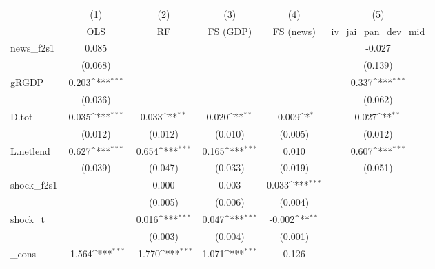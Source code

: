 {
\def\sym#1{\ifmmode^{#1}\else\(^{#1}\)\fi}
\begin{tabular}{l*{5}{c}}
\toprule
            &\multicolumn{1}{c}{(1)}&\multicolumn{1}{c}{(2)}&\multicolumn{1}{c}{(3)}&\multicolumn{1}{c}{(4)}&\multicolumn{1}{c}{(5)}\\
            &\multicolumn{1}{c}{OLS}&\multicolumn{1}{c}{RF}&\multicolumn{1}{c}{FS (GDP)}&\multicolumn{1}{c}{FS (news)}&\multicolumn{1}{c}{iv\_jai\_pan\_dev\_mid}\\
\midrule
news\_f2s1   &       0.085         &                     &                     &                     &      -0.027         \\
            &     (0.068)         &                     &                     &                     &     (0.139)         \\
\addlinespace
gRGDP       &       0.203\sym{***}&                     &                     &                     &       0.337\sym{***}\\
            &     (0.036)         &                     &                     &                     &     (0.062)         \\
\addlinespace
D.tot       &       0.035\sym{***}&       0.033\sym{**} &       0.020\sym{**} &      -0.009\sym{*}  &       0.027\sym{**} \\
            &     (0.012)         &     (0.012)         &     (0.010)         &     (0.005)         &     (0.012)         \\
\addlinespace
L.netlend   &       0.627\sym{***}&       0.654\sym{***}&       0.165\sym{***}&       0.010         &       0.607\sym{***}\\
            &     (0.039)         &     (0.047)         &     (0.033)         &     (0.019)         &     (0.051)         \\
\addlinespace
shock\_f2s1  &                     &       0.000         &       0.003         &       0.033\sym{***}&                     \\
            &                     &     (0.005)         &     (0.006)         &     (0.004)         &                     \\
\addlinespace
shock\_t     &                     &       0.016\sym{***}&       0.047\sym{***}&      -0.002\sym{**} &                     \\
            &                     &     (0.003)         &     (0.004)         &     (0.001)         &                     \\
\addlinespace
\_cons      &      -1.564\sym{***}&      -1.770\sym{***}&       1.071\sym{***}&       0.126         &                     \\

\end{tabular}}
